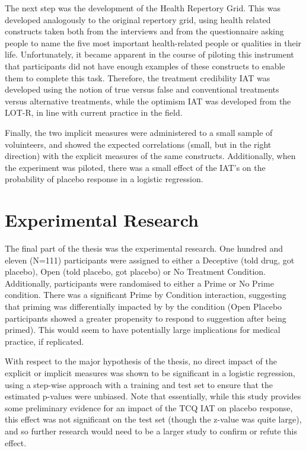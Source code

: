 The next step was the development of the Health Repertory Grid. This was developed analogously to the original repertory grid, using health related constructs taken both from the interviews and from the questionnaire asking people to name the five most important health-related people or qualities in their life. Unfortunately, it became apparent in the course of piloting this instrument that participants did not have enough examples of these constructs to enable them to complete this task. Therefore, the treatment credibility IAT was developed using the notion of true versus false and conventional treatments versus alternative treatments, while the optimism IAT was developed from the LOT-R, in line with current practice in the field. 

Finally, the two implicit measures were administered to a small sample of voluinteers, and showed the expected correlations (small, but in the right direction) with the explicit measures of the same constructs. Additionally, when the experiment was piloted, there was a small effect of the IAT's on the probability of placebo response in a logistic regression. 

\section{Experimental Research}
\label{sec:exper-rese}

The final part of the thesis was the experimental research. One hundred and eleven (N=111) participants were assigned to either a Deceptive (told drug, got placebo), Open (told placebo, got placebo) or No Treatment Condition. Additionally, participants were randomised to either a Prime or No Prime condition. %
There was a significant Prime by Condition interaction, suggesting that priming was differentially impacted by by the condition (Open Placebo participants showed a greater propensity to respond to suggestion after being primed). This would seem to have potentially large implications for medical practice, if replicated. 

With respect to the major hypothesis of the thesis, no direct impact of the explicit or implicit measures was shown to be significant in a logistic regression, using a step-wise approach with a training and test set to ensure that the estimated p-values were unbiased. Note that essentially, while this study provides some preliminary evidence for an impact of the TCQ IAT on placebo response, this effect was not significant on the test set (though the z-value was quite large), and so further research would need to be a larger study to confirm or refute this effect. 

